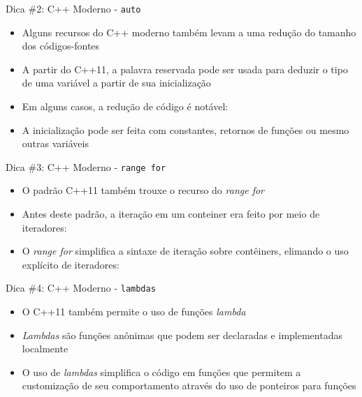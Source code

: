 \begin{frame}[fragile]{Dica \#2: C++ Moderno - \texttt{auto}}

    \begin{itemize}
        \item Alguns recursos do C++ moderno também levam a uma redução do tamanho dos 
        códigos-fontes

        \item A partir do C++11, a palavra reservada  pode ser usada para 
            deduzir o tipo de uma variável a partir de sua inicialização

        \item Em alguns casos, a redução de código é notável:

        \item A inicialização pode ser feita com constantes, retornos de funções ou mesmo
            outras variáveis
    \end{itemize}

\end{frame}

\begin{frame}[fragile]{Dica \#3: C++ Moderno - \texttt{range for}}

    \begin{itemize}
        \item O padrão C++11 também trouxe o recurso do \textit{range for}

        \item Antes deste padrão, a iteração em um conteiner era feito por meio de iteradores:

        \item O \textit{range for} simplifica a sintaxe de iteração sobre contêiners,
            elimando o uso explícito de iteradores:
    \end{itemize}

\end{frame}

\begin{frame}[fragile]{Dica \#4: C++ Moderno - \texttt{lambdas}}

    \begin{itemize}
        \item O C++11 também permite o uso de funções \textit{lambda}

        \item \textit{Lambdas} são funções anônimas que podem ser declaradas e 
            implementadas localmente

        \item O uso de \textit{lambdas} simplifica o código em
            funções que permitem a customização de seu comportamento através do uso de
            ponteiros para funções
    \end{itemize}

\end{frame}

